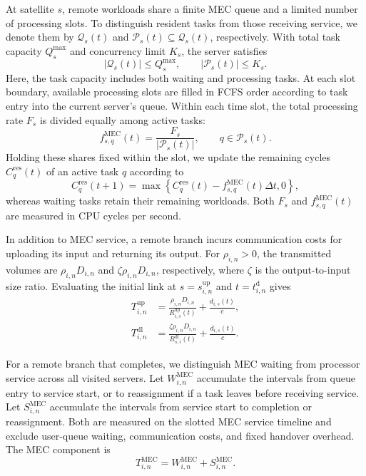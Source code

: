 \documentclass[journal]{IEEEtran}
\begin{document}
At satellite $s$, remote workloads share a finite MEC
queue and a limited number of processing slots.
To distinguish resident tasks from those receiving
service, we denote them by $\mathcal{Q}_s(t)$ and
$\mathcal{P}_s(t)\subseteq\mathcal{Q}_s(t)$, respectively.
With total task capacity $Q_s^{\max}$ and concurrency
limit $K_s$, the server satisfies
\begin{equation}
|\mathcal{Q}_s(t)|\leq Q_s^{\max},
\qquad
|\mathcal{P}_s(t)|\leq K_s.
\label{eq:mec_capacity}
\end{equation}
Here, the task capacity includes both waiting and
processing tasks. At each slot boundary, available processing slots
are filled in FCFS order according to task entry
into the current server's queue.
Within each time slot, the total processing rate
$F_s$ is divided equally among active tasks:
\begin{equation}
f^{\mathrm{MEC}}_{s,q}(t)
=\frac{F_s}{|\mathcal{P}_s(t)|},
\qquad q\in\mathcal{P}_s(t).
\label{eq:mec_rate}
\end{equation}
Holding these shares fixed within the slot, we update
the remaining cycles $C_q^{\mathrm{res}}(t)$ of an
active task $q$ according to
\begin{equation}
C_q^{\mathrm{res}}(t+1)=
\max\left\{
C_q^{\mathrm{res}}(t)
-f^{\mathrm{MEC}}_{s,q}(t)\Delta t,0
\right\},
\label{eq:remaining_workload}
\end{equation}
whereas waiting tasks retain their remaining workloads.
Both $F_s$ and $f^{\mathrm{MEC}}_{s,q}(t)$ are measured
in CPU cycles per second.

In addition to MEC service, a remote branch incurs
communication costs for uploading its input and returning
its output. For $\rho_{i,n}>0$, the transmitted volumes
are $\rho_{i,n}D_{i,n}$ and
$\zeta\rho_{i,n}D_{i,n}$, respectively, where $\zeta$
is the output-to-input size ratio. Evaluating the initial
link at $s=s_{i,n}^{\mathrm{up}}$ and
$t=t_{i,n}^{\mathrm d}$ gives
\begin{align}
T^{\mathrm{up}}_{i,n}
&=\frac{\rho_{i,n}D_{i,n}}
{R^{\mathrm{up}}_{i,s}(t)}
+\frac{d_{i,s}(t)}{c},
\label{eq:upload_delay}\\
T^{\mathrm{dl}}_{i,n}
&=\frac{\zeta\rho_{i,n}D_{i,n}}
{R^{\mathrm{dl}}_{s,i}(t)}
+\frac{d_{i,s}(t)}{c}.
\label{eq:download_delay}
\end{align}

For a remote branch that completes, we distinguish
MEC waiting from processor service across all visited
servers. Let $W^{\mathrm{MEC}}_{i,n}$ accumulate the
intervals from queue entry to service start, or to
reassignment if a task leaves before receiving service.
Let $S^{\mathrm{MEC}}_{i,n}$ accumulate the intervals
from service start to completion or reassignment.
Both are measured on the slotted MEC service timeline
and exclude user-queue waiting, communication costs,
and fixed handover overhead. The MEC component is
\begin{equation}
T^{\mathrm{MEC}}_{i,n}
=
W^{\mathrm{MEC}}_{i,n}
+
S^{\mathrm{MEC}}_{i,n}.
\label{eq:mec_residence}
\end{equation}
\end{document}
